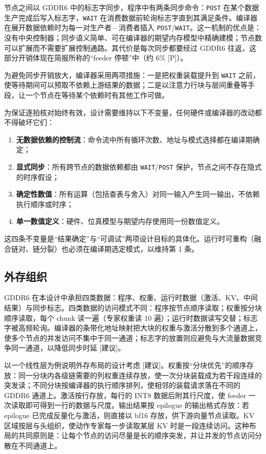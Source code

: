 \documentclass[a4paper,10.5pt]{ctexart}
\newcommand{\tP}{\textsf{[P]}}              %
\newcommand{\tR}{\textsf{[建议]}}           %
\begin{document}
节点之间以 GDDR6 中的标志字同步，程序中有两条同步命令：\texttt{POST} 在某个数据生产完成后写入标志字，\texttt{WAIT} 在消费数据前轮询标志字直到其满足条件。编译器在展开数据依赖时为每一对生产者—消费者插入 \texttt{POST}/\texttt{WAIT}。这一机制的优点是：没有中央控制器；同步语义简单、可在编译器的期望内存模型中精确建模；节点数可以扩展而不需要扩展控制通路。其代价是每次同步都要经过 GDDR6 往返，这部分开销体现在简报所称的“feeder 停顿”中（约 6\% \tP）。

为避免同步开销放大，编译器采用两项措施：一是把权重装载提升到 \texttt{WAIT} 之前，使等待期间可以预取不依赖上游结果的数据；二是以注意力行块与层间重叠等手段，让一个节点在等待某个依赖时有其他工作可做。

为保证逐拍核对始终有效，设计需要维持以下不变量，任何硬件或编译器的改动都不得破坏它们：
\begin{enumerate}
  \item \textbf{无数据依赖的控制流}：命令流中所有循环次数、地址与模式选择都在编译期确定；
  \item \textbf{显式同步}：所有跨节点的数据依赖都由 \texttt{WAIT}/\texttt{POST} 保护，节点之间不存在隐式的时序假设；
  \item \textbf{确定性数值}：所有运算（包括查表与舍入）对同一输入产生同一输出，不依赖执行顺序或时序；
  \item \textbf{单一数值定义}：硬件、位真模型与期望内存使用同一份数值定义。
\end{enumerate}
这四条不变量是“结果确定”与“可调试”两项设计目标的具体化。运行时可重构（融合链对、链分裂）也必须在编译期选定模式，以维持第 1 条。

\subsection{外存组织}

GDDR6 在本设计中承担四类数据：程序、权重、运行时数据（激活、KV、中间结果）与同步标志。四类数据的访问模式不同：程序按节点顺序读取；权重按分块顺序读取，每个 chunk 读一遍（专家权重读 10 遍）；运行时数据读写交替；标志字被高频轮询。编译器的条带化地址映射把大块的权重与激活分散到多个通道上，使多个节点的并发访问不集中于同一通道；标志字的放置则应避免与大流量数据竞争同一通道，以降低同步时延 \tR。

以一个线性层为例说明外存布局的设计考虑 \tR。权重按“分块优先”的顺序存放：同一分块内各级链需要的列权重连续存放，使一次分块装载成为若干段连续的突发读；不同分块按编译器的执行顺序排列，使相邻的装载请求落在不同的 GDDR6 通道上。激活按行存放，每行的 INT8 数据后附其行尺度，使 feeder 一次读取即可得到一行的数据与尺度。输出结果按 epilogue 的输出格式存放：若 epilogue 已完成反量化与激活，则直接以 bf16 存放，供下游向量节点读取。KV 区域按层与头组织，使动作专家每一步读取某层 KV 时是一段连续访问。这种布局的共同原则是：让每个节点的访问尽量是长的顺序突发，并让并发的节点访问分散在不同通道上。
\end{document}
